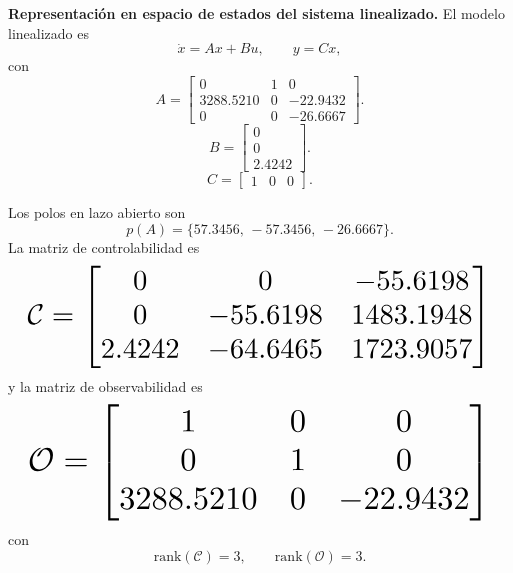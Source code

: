 \documentclass[conference]{IEEEtran}
\newcommand{\fitmat}[1]{\resizebox{0.96\columnwidth}{!}{$\displaystyle #1$}}
\begin{document}
\noindent
\textbf{Representaci\'on en espacio de estados del sistema linealizado.} El modelo linealizado es
\begin{equation}
\dot{x}=Ax+Bu, \qquad y=Cx,
\end{equation}
con
\begin{equation}
A=
\begin{bmatrix}
0 & 1 & 0\\
3288.5210 & 0 & -22.9432\\
0 & 0 & -26.6667
\end{bmatrix}.
\end{equation}
\begin{equation}
B=
\begin{bmatrix}
0\\
0\\
2.4242
\end{bmatrix}.
\end{equation}
\begin{equation}
C=
\begin{bmatrix}
1 & 0 & 0
\end{bmatrix}.
\end{equation}

Los polos en lazo abierto son
\begin{equation}
p(A)=\{57.3456,\,-57.3456,\,-26.6667\}.
\end{equation}
La matriz de controlabilidad es
\begin{equation}
\fitmat{
\mathcal{C}=
\begin{bmatrix}
0 & 0 & -55.6198\\
0 & -55.6198 & 1483.1948\\
2.4242 & -64.6465 & 1723.9057
\end{bmatrix}}
\end{equation}
y la matriz de observabilidad es
\begin{equation}
\fitmat{
\mathcal{O}=
\begin{bmatrix}
1 & 0 & 0\\
0 & 1 & 0\\
3288.5210 & 0 & -22.9432
\end{bmatrix}}
\end{equation}
con
\begin{equation}
\mathrm{rank}(\mathcal{C})=3, \qquad \mathrm{rank}(\mathcal{O})=3.
\end{equation}
\end{document}

